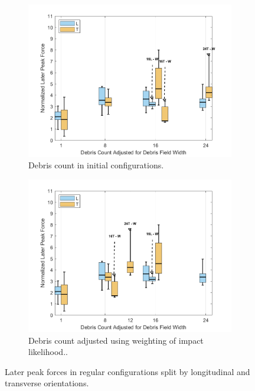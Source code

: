 \documentclass{article}
\begin{document}
\begin{figure}[htbp]
    \centering
    \begin{subfigure}[t]{0.9\textwidth}
        \centering
        \includegraphics[width=\textwidth]{LaterPeak_Regular_SplitByTrial.png}
        \caption{Debris count in initial configurations.}
        \label{fig:laterpeak_regular_original}
    \end{subfigure}
    \hfill
    \begin{subfigure}[t]{0.9\textwidth}
        \centering
        \includegraphics[width=\textwidth]{LaterPeak_Regular_RemappedT.png}
        \caption{Debris count adjusted using weighting of impact likelihood..}
        \label{fig:laterpeak_regular_remap}
    \end{subfigure}
    \caption{Later peak forces  in regular configurations split by longitudinal and transverse orientations.}
    \label{fig:laterpeak_regular_split}
\end{figure}
\end{document}
